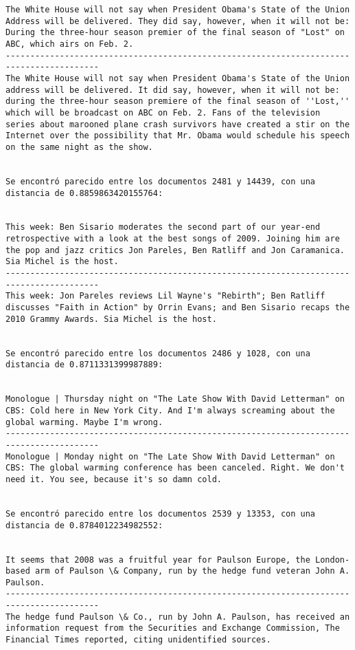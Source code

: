 \documentclass[11pt]{article}
\begin{document}
\begin{Verbatim}[commandchars=\\\{\}]
The White House will not say when President Obama's State of the Union Address will be delivered. They did say, however, when it will not be: During the three-hour season premier of the final season of "Lost" on ABC, which airs on Feb. 2.
-----------------------------------------------------------------------------------------
The White House will not say when President Obama's State of the Union address will be delivered. It did say, however, when it will not be: during the three-hour season premiere of the final season of ''Lost,'' which will be broadcast on ABC on Feb. 2. Fans of the television series about marooned plane crash survivors have created a stir on the Internet over the possibility that Mr. Obama would schedule his speech on the same night as the show.


Se encontró parecido entre los documentos 2481 y 14439, con una distancia de 0.8859863420155764:


This week: Ben Sisario moderates the second part of our year-end retrospective with a look at the best songs of 2009. Joining him are the pop and jazz critics Jon Pareles, Ben Ratliff and Jon Caramanica. Sia Michel is the host.
-----------------------------------------------------------------------------------------
This week: Jon Pareles reviews Lil Wayne's "Rebirth"; Ben Ratliff discusses "Faith in Action" by Orrin Evans; and Ben Sisario recaps the 2010 Grammy Awards. Sia Michel is the host.


Se encontró parecido entre los documentos 2486 y 1028, con una distancia de 0.8711331399987889:


Monologue | Thursday night on "The Late Show With David Letterman" on CBS: Cold here in New York City. And I'm always screaming about the global warming. Maybe I'm wrong.
-----------------------------------------------------------------------------------------
Monologue | Monday night on "The Late Show With David Letterman" on CBS: The global warming conference has been canceled. Right. We don't need it. You see, because it's so damn cold.


Se encontró parecido entre los documentos 2539 y 13353, con una distancia de 0.8784012234982552:


It seems that 2008 was a fruitful year for Paulson Europe, the London-based arm of Paulson \& Company, run by the hedge fund veteran John A. Paulson.
-----------------------------------------------------------------------------------------
The hedge fund Paulson \& Co., run by John A. Paulson, has received an information request from the Securities and Exchange Commission, The Financial Times reported, citing unidentified sources.



\end{Verbatim}
\end{document}

